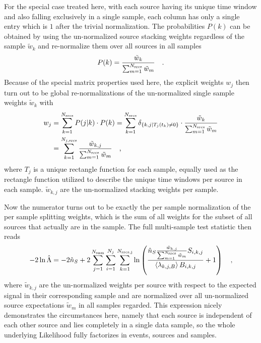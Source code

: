 For the special case treated here, with each source having its unique time window and also falling exclusively in a single sample, each column has only a single entry which is $1$ after the trivial normalization.
The probabilities $P(k)$ can be obtained by using the un-normalized source stacking weights regardless of the sample $\tilde{w}_k$ and re-normalize them over all sources in all samples
\begin{equation}
  P(k) = \frac{\tilde{w}_k}{\sum_{m=1}^{N_\text{srcs}} \tilde{w}_m}
  \quad\text{.}
\end{equation}
Because of the special matrix properties used here, the explicit weights $w_j$ then turn out to be global re-normalizations of the un-normalized single sample weights $\tilde{w}_k$ with
\begin{align}
  w_j
    &= \sum_{k=1}^{N_\text{srcs}} P(j|k)\cdot P(k)
    = \sum_{k=1}^{N_\text{srcs}}
      \delta_{\{k,j|T_j(t_k)\neq 0\}} \cdot
      \frac{\tilde{w}_k}{\sum_{m=1}^{N_\text{srcs}} \tilde{w}_m} \\
    &= \sum_{k=1}^{N_{j,\text{srcs}}}
      \frac{\tilde{w}_{k,j}}{\sum_{m=1}^{N_\text{srcs}} \tilde{w}_m}
  \quad\text{,}
\end{align}
where $T_j$ is a unique rectangle function for each sample, equally used as the rectangle function utilized to describe the unique time windows per source in each sample.
$\tilde{w}_{k,j}$ are the un-normalized stacking weights per sample.

Now the numerator turns out to be exactly the per sample normalization of the per sample splitting weights, which is the sum of all weights for the subset of all sources that actually are in the sample.
The full multi-sample test statistic then reads
\begin{equation}
  -2\ln\hat{\Lambda}
  = -2\hat{n}_S +
      2\sum_{j=1}^{N_\text{sam}} \sum_{i=1}^{N_j} \sum_{k=1}^{N_\text{srcs,j}}
      \ln\left(
        \frac{\hat{n}_{S}\frac{\tilde{w}_{k,j}}{\sum_{m=1}^{N_\text{srcs}}
              \tilde{w}_m} S_{i,k,j}}
             {\Braket{\lambda_{k,j,B}} B_{i,k,j}}
        + 1
      \right)
  \quad\text{,}
\end{equation}
where $\tilde{w}_{k,j}$ are the un-normalized weights per source with respect to the expected signal in their corresponding sample and are normalized over all un-normalized source expectations $\tilde{w}_m$ in all samples regarded.
This expression nicely demonstrates the circumstances here, namely that each source is independent of each other source and lies completely in a single data sample, so the whole underlying Likelihood fully factorizes in events, sources and samples.


